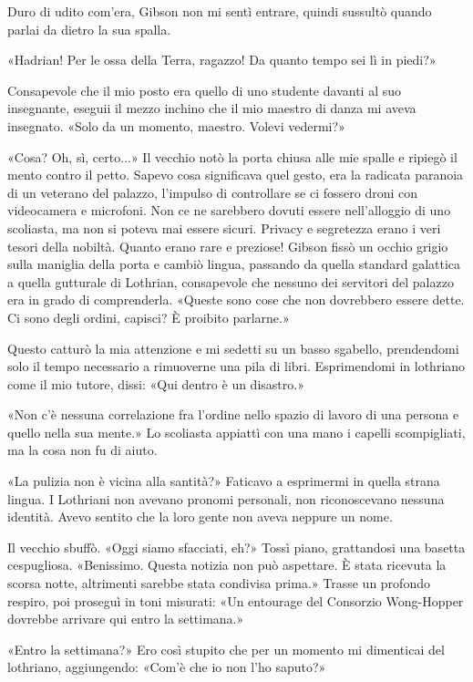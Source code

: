 Duro di udito com'era, Gibson non mi sentì entrare, quindi sussultò
quando parlai da dietro la sua spalla.

«Hadrian! Per le ossa della Terra, ragazzo! Da quanto tempo sei lì in
piedi?»

Consapevole che il mio posto era quello di uno studente davanti al suo
insegnante, eseguii il mezzo inchino che il mio maestro di danza mi
aveva insegnato. «Solo da un momento, maestro. Volevi vedermi?»

«Cosa? Oh, sì, certo...» Il vecchio notò la porta chiusa alle mie spalle
e ripiegò il mento contro il petto. Sapevo cosa significava quel gesto,
era la radicata paranoia di un veterano del palazzo, l'impulso di
controllare se ci fossero droni con videocamera e microfoni. Non ce ne
sarebbero dovuti essere nell'alloggio di uno scoliasta, ma non si poteva
mai essere sicuri. Privacy e segretezza erano i veri tesori della
nobiltà. Quanto erano rare e preziose! Gibson fissò un occhio grigio
sulla maniglia della porta e cambiò lingua, passando da quella standard
galattica a quella gutturale di Lothrian, consapevole che nessuno dei
servitori del palazzo era in grado di comprenderla. «Queste sono cose
che non dovrebbero essere dette. Ci sono degli ordini, capisci? È
proibito parlarne.»

Questo catturò la mia attenzione e mi sedetti su un basso sgabello,
prendendomi solo il tempo necessario a rimuoverne una pila di libri.
Esprimendomi in lothriano come il mio tutore, dissi: «Qui dentro è un
disastro.»

«Non c'è nessuna correlazione fra l'ordine nello spazio di lavoro di una
persona e quello nella sua mente.» Lo scoliasta appiattì con una mano i
capelli scompigliati, ma la cosa non fu di aiuto.

«La pulizia non è vicina alla santità?» Faticavo a esprimermi in quella
strana lingua. I Lothriani non avevano pronomi personali, non
riconoscevano nessuna identità. Avevo sentito che la loro gente non
aveva neppure un nome.

Il vecchio sbuffò. «Oggi siamo sfacciati, eh?» Tossì piano, grattandosi
una basetta cespugliosa. «Benissimo. Questa notizia non può aspettare. È
stata ricevuta la scorsa notte, altrimenti sarebbe stata condivisa
prima.» Trasse un profondo respiro, poi proseguì in toni misurati: «Un
entourage del Consorzio Wong-Hopper dovrebbe arrivare qui entro la
settimana.»

«Entro la settimana?» Ero così stupito che per un momento mi dimenticai
del lothriano, aggiungendo: «Com'è che io non l'ho saputo?»

